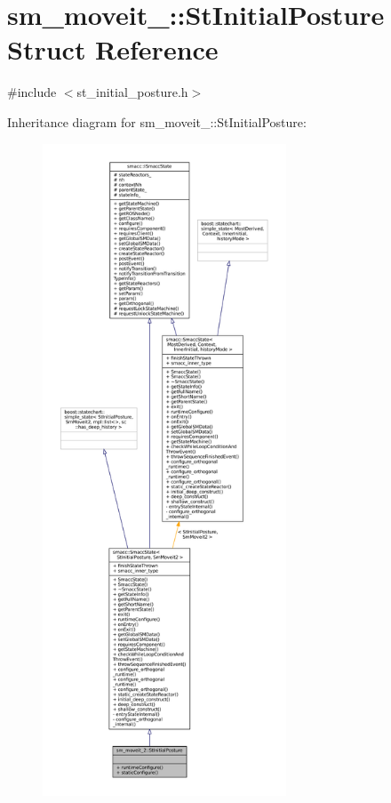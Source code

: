 \hypertarget{structsm__moveit__2_1_1StInitialPosture}{}\section{sm\+\_\+moveit\+\_\+:\+:St\+Initial\+Posture Struct Reference}
\label{structsm__moveit__2_1_1StInitialPosture}


{\ttfamily \#include $<$st\+\_\+initial\+\_\+posture.\+h$>$}



Inheritance diagram for sm\+\_\+moveit\+\_\+:\+:St\+Initial\+Posture\+:
\nopagebreak
\begin{figure}[H]
\begin{center}
\leavevmode
\includegraphics[height=550pt]{structsm__moveit__2_1_1StInitialPosture__inherit__graph}
\end{center}
\end{figure}


